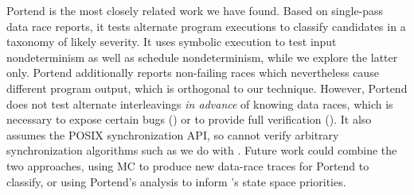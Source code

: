 Portend \cite{portend} is the most closely related work we have found.
Based on single-pass data race reports, it tests alternate program executions to classify candidates in a taxonomy of likely severity.
It uses symbolic execution to test input nondeterminism as well as schedule nondeterminism,
while we explore the latter only.
Portend additionally reports non-failing races which nevertheless cause
different program output, which is orthogonal to our technique.
However, Portend does not test alternate interleavings {\em in advance} of knowing data races,
which is necessary to expose certain bugs (\sect{\ref{sec:eval-falseneg}}) or to provide full verification (\sect{\ref{sec:totalverif}}).
It also assumes the POSIX synchronization API, so cannot verify arbitrary synchronization algorithms such as we do with \mxtest.
Future work could combine the two approaches, using MC to produce new data-race traces for Portend to classify, or using Portend's analysis to inform \quicksand's state space priorities.

%





